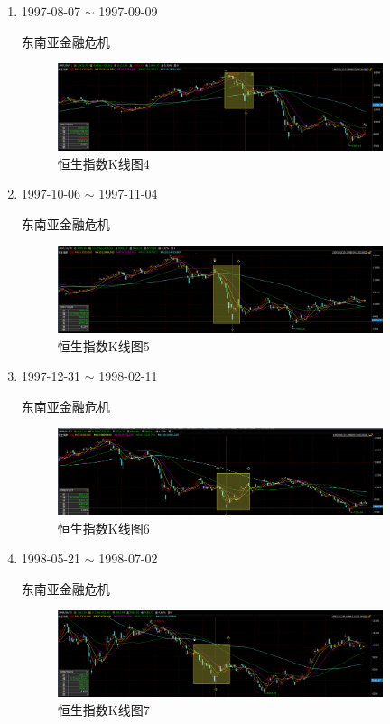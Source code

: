 \documentclass[12pt,a4paper]{article}
\begin{document}
\begin{enumerate}
	\item 1997-08-07 $\sim$ 1997-09-09
	
	东南亚金融危机
	
		\begin{figure}[H]
		\centering
		\includegraphics[width=0.9\textwidth]{img/34.png}%
		\caption{恒生指数K线图4}
	\end{figure}	
	
	\item 1997-10-06 $\sim$ 1997-11-04
	
	东南亚金融危机
		\begin{figure}[H]
		\centering
		\includegraphics[width=0.9\textwidth]{img/35.png}%
		\caption{恒生指数K线图5}
	\end{figure}	
	
	\item 1997-12-31 $\sim$ 1998-02-11
	
	东南亚金融危机
		\begin{figure}[H]
		\centering
		\includegraphics[width=0.9\textwidth]{img/36.png}%
		\caption{恒生指数K线图6}
	\end{figure}	
	
	\item 1998-05-21 $\sim$ 1998-07-02
	
	东南亚金融危机
		\begin{figure}[H]
		\centering
		\includegraphics[width=0.9\textwidth]{img/37.png}%
		\caption{恒生指数K线图7}
	\end{figure}	
	

\end{enumerate}
\end{document}
